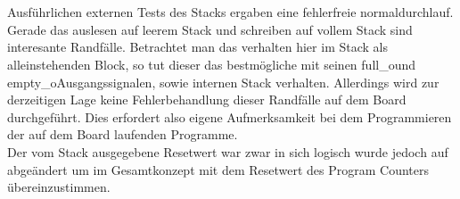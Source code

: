 \documentclass[bibliography=totoc,listof=totoc,index=totoc]{scrartcl}
\begin{document}
\\ \\
Ausführlichen externen Tests des Stacks ergaben eine fehlerfreie normaldurchlauf. Gerade das auslesen auf leerem Stack und schreiben auf vollem Stack sind interesante Randfälle. Betrachtet man das verhalten hier im Stack als alleinstehenden Block, so tut dieser das bestmögliche mit seinen \glqq full\_o\grqq und \glqq empty\_o\grqq Ausgangssignalen, sowie internen Stack verhalten. Allerdings wird zur derzeitigen Lage keine Fehlerbehandlung dieser Randfälle auf dem Board durchgeführt. Dies erfordert also eigene Aufmerksamkeit bei dem Programmieren der auf dem Board laufenden Programme. \\
Der vom Stack ausgegebene Resetwert war zwar in sich logisch wurde jedoch auf \grqq abgeändert um im Gesamtkonzept mit dem Resetwert des Program Counters übereinzustimmen.
\end{document}
